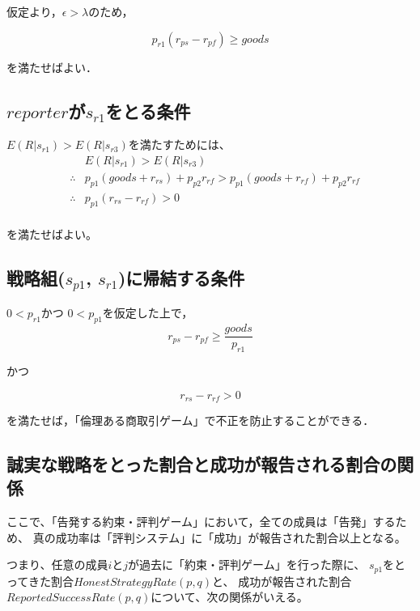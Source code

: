 仮定より，$ \epsilon > \lambda $のため，

\begin{equation}
  p_{r1} (r_{ps} - r_{pf}) \geq goods
\end{equation}

を満たせばよい．

\subsection{$reporter$が$s_{r1}$をとる条件}

$ E(R|s_{r1}) > E(R|s_{r3}) $を満たすためには、
\begin{eqnarray*}
  &&E(R|s_{r1}) > E(R|s_{r3}) \\
  &\therefore& p_{p1} (goods + r_{rs}) + p_{p2} r_{rf} > p_{p1}(goods+r_{rf}) + p_{p2} r_{rf} \\
  &\therefore& p_{p1}(r_{rs} - r_{rf}) > 0 \\
\end{eqnarray*}

を満たせばよい。


\subsection{戦略組($s_{p1}$, $s_{r1}$)に帰結する条件}

$ 0<p_{r1} $かつ $ 0 < p_{p1}$を仮定した上で，\\

\begin{equation}
  r_{ps} - r_{pf} \geq \frac{goods}{p_{r1}}
\end{equation}

かつ

\begin{equation}
  r_{rs} - r_{rf} > 0
\end{equation}

を満たせば，「倫理ある商取引ゲーム」で不正を防止することができる．

\subsection{誠実な戦略をとった割合と成功が報告される割合の関係}
ここで、「告発する約束・評判ゲーム」において，全ての成員は「告発」するため、
真の成功率は「評判システム」に「成功」が報告された割合以上となる。

つまり、任意の成員$i$と$j$が過去に「約束・評判ゲーム」を行った際に、
$s_{p1}$をとってきた割合$HonestStrategyRate(p, q)$と、
成功が報告された割合$ReportedSuccessRate(p, q)$について、次の関係がいえる。

